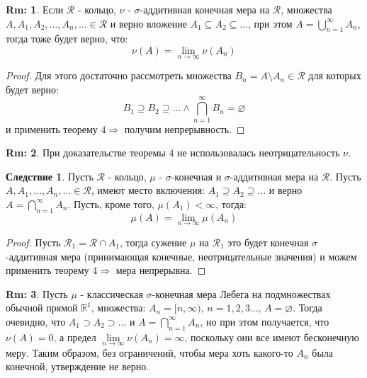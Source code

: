 \documentclass[12pt]{article}
\newcommand{\MR}{\mathbb{R}}
\newcommand{\MCR}{\mathcal{R}}
\newcommand{\VN}{\varnothing}
\theoremstyle{definition}
\newtheorem{rem}{Rm:}
\newtheorem{corollary}{Следствие}
\begin{document}
\begin{rem}
	Если $\MCR$ - кольцо, $\nu$ - $\sigma$-аддитивная конечная мера на $\MCR$, множества $A, A_1, A_2, \dotsc, A_n, \dotsc \in \MCR$ и верно вложение $A_1 \subseteq A_2 \subseteq \dotsc $, при этом $A = \bigcup\limits_{n = 1}^{\infty} A_n$, тогда тоже будет верно, что: 
	$$
		\nu(A) = \lim\limits_{n \to \infty} \nu(A_n)
	$$
\end{rem}
\begin{proof}
	Для этого достаточно рассмотреть множества $B_n = A \setminus A_n \in \MCR$ для которых будет верно: 
	$$
		B_1 \supseteq B_2 \supseteq \dotsc \wedge \bigcap\limits_{n = 1}^{\infty}B_n = \VN
	$$ 
	и применить теорему $4 \Rightarrow$ получим непрерывность.
\end{proof}

\begin{rem}
	При доказательстве теоремы $4$ не использовалась неотрицательность $\nu$.
\end{rem}

\begin{corollary}
	Пусть $\MCR$ - кольцо, $\mu$ - $\sigma$-конечная и $\sigma$-аддитивная мера на $\MCR$. Пусть $A, A_1, \dotsc, A_n, \dotsc \in \MCR$, имеют место включения: $A_1 \supseteq A_2 \supseteq \dotsc $ и верно $A = \bigcap\limits_{n = 1}^{\infty} A_n$. Пусть, кроме того, $\mu(A_1) < \infty$, тогда: 
	$$
		\mu(A) = \lim\limits_{n \to \infty} \mu(A_n)
	$$
\end{corollary}
\begin{proof}
	Пусть $\MCR_1 = \MCR \cap A_1$, тогда сужение $\mu$ на $\MCR_1$ это будет конечная $\sigma$-аддитивная мера (принимающая конечные, неотрицательные значения) и можем применить теорему $4 \Rightarrow$ мера непрерывна. 
\end{proof}

\begin{rem}
	Пусть $\mu$ - классическая $\sigma$-конечная мера Лебега на подмножествах обычной прямой $\MR^1$, множества: $A_n = [n, \infty), \, n = 1,2,3 \dotsc$, $A = \VN$. Тогда очевидно, что $A_1 \supset A_2 \supset \dotsc$ и $A = \bigcap\limits_{n = 1}^{\infty}A_n$, но при этом получается, что  $\nu(A) = 0$, а предел $\lim\limits_{n \to \infty}\nu(A_n) = \infty$, поскольку они все имеют бесконечную меру. Таким образом, без ограничений, чтобы мера хоть какого-то $A_n$ была конечной, утверждение не верно.
\end{rem}
\end{document}
